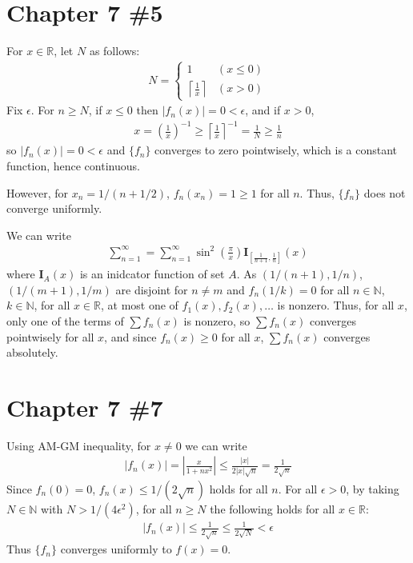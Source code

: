 \documentclass{scrartcl}
\begin{document}
\section{Chapter 7 \#5}
For \(x \in \mathbb{R}\), let \(N\) as follows:
\begin{align*}
  N = \begin{cases}
    1 & (x \leq 0) \\
    \left\lceil \frac{1}{x} \right\rceil & (x > 0)
  \end{cases}
\end{align*}
Fix \(\epsilon\). For \(n \geq N\), if \(x \leq 0\) then \(|f_n(x)| = 0 <
\epsilon\), and if \(x > 0\),
\begin{align*}
  x = \left( \frac{1}{x} \right)^{-1}
  \geq \left\lceil \frac{1}{x} \right\rceil^{-1} = \frac{1}{N} \geq \frac{1}{n}
\end{align*}
so \(|f_n(x)| = 0 < \epsilon\) and \(\{f_n\}\) converges to zero pointwisely,
which is a constant function, hence continuous.

However, for \(x_n = 1 / (n + 1/2)\), \(f_n(x_n) = 1 \geq 1\) for all \(n\).
Thus, \(\{f_n\}\) does not converge uniformly.

We can write
\begin{align*}
  \sum^\infty_{n = 1}
  = \sum^\infty_{n = 1} \sin^2 \left( \frac{\pi}{x} \right)
  \mathbf{I}_{\left[\frac{1}{n + 1}, \frac{1}{n}\right]}(x)
\end{align*}
where \(\mathbf{I}_A(x)\) is an inidcator function of set \(A\). As \((1 /
(n + 1), 1 / n)\), \((1 / (m + 1), 1 / m)\) are disjoint for \(n \not = m\)
and \(f_n(1 / k) = 0\) for all \(n \in \mathbb{N}\), \(k \in \mathbb{N}\), for
all \(x \in \mathbb{R}\), at most one of \(f_1(x), f_2(x), \dots\) is nonzero.
Thus, for all \(x\), only one of the terms of \(\sum f_n(x)\) is nonzero, so
\(\sum f_n(x)\) converges pointwisely for all \(x\), and since \(f_n(x) \geq
0\) for all \(x\), \(\sum f_n(x)\) converges absolutely.

\section{Chapter 7 \#7}
Using AM-GM inequality, for \(x \not = 0\) we can write
\begin{align*}
  |f_n(x)| = \left| \frac{x}{1 + nx^2} \right| \leq \frac{|x|}{2|x| \sqrt{n}}
  = \frac{1}{2\sqrt{n}}
\end{align*}
Since \(f_n(0) = 0\), \(f_n(x) \leq 1 / (2\sqrt{n})\) holds for all \(n\). For
all \(\epsilon > 0\), by taking \(N \in \mathbb{N}\) with \(N > 1 /
(4\epsilon^2)\), for all \(n \geq N\) the following holds for all \(x \in
\mathbb{R}\):
\begin{align*}
  |f_n(x)| \leq \frac{1}{2\sqrt{n}} \leq \frac{1}{2\sqrt{N}} < \epsilon
\end{align*}
Thus \(\{f_n\}\) converges uniformly to \(f(x) = 0\).
\end{document}

